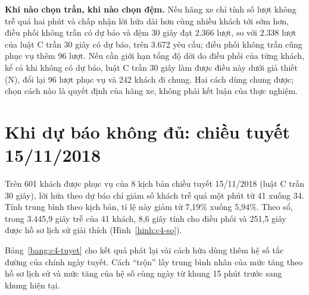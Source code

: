 \textbf{Khi nào chọn trần, khi nào chọn đệm.} Nếu hãng xe chỉ tính số lượt không trễ quá hai phút và chấp nhận lời hứa
dài hơn cùng nhiều khách tới sớm hơn, điều phối không trần có dự báo và đệm 30 giây đạt 2.366 lượt, so với 2.338 lượt
của luật C trần 30 giây có dự báo, trên 3.672 yêu cầu; điều phối không trần cũng phục vụ thêm 96 lượt. Nếu cần giới hạn
tổng độ dời do điều phối của từng khách, kể cả khi không có dự báo, luật C trần 30 giây làm được điều này dưới giả thiết
(N), đổi lại 96 lượt phục vụ và 242 khách đi chung. Hai cách dùng chung được; chọn cách nào là quyết định của hãng xe,
không phải kết luận của thực nghiệm.

\section{Khi dự báo không đủ: chiều tuyết 15/11/2018}
\label{muc:c4-tuyet}

Trên 601 khách được phục vụ của 8 kịch bản chiều tuyết 15/11/2018 (luật C trần 30 giây), lời hứa theo dự báo chỉ giảm
số khách trễ quá một phút từ 41 xuống 34. Tính trung bình theo kịch bản, tỉ lệ này giảm từ 7,19\% xuống 5,94\%. Theo
sổ, trong 3.445,9 giây trễ của 41 khách, 8,6 giây tính cho điều phối và 251,5 giây được hồ sơ lịch sử giải thích
(Hình~\ref{hinh:c4-so}).

Bảng~\ref{bang:c4-tuyet} cho kết quả phát lại vài cách hứa dùng thêm hệ số tắc đường của chính ngày tuyết. Cách ``trộn'' lấy trung
bình nhân của mức tăng theo hồ sơ lịch sử và mức tăng của hệ số cùng ngày từ khung 15 phút trước sang khung hiện tại.

